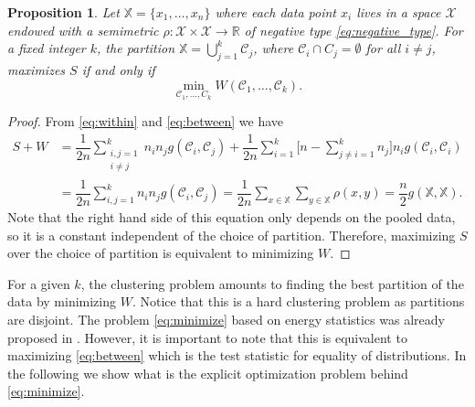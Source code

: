 \documentclass[aps,preprint,nofootinbib,floatfix]{revtex4-1}
\newtheorem{proposition}[theorem]{Proposition}
\newcommand\C{{\mathcal{C}}}
\begin{document}
\begin{proposition}
\label{th:minimize}
Let $\mathbb{X} = \{x_1,\dotsc,x_n\}$ where each data point
$x_i$ lives in a space $\mathcal{X}$ endowed with a semimetric $\rho:
\mathcal{X}\times\mathcal{X} \to \mathbb{R}$ of
negative type \eqref{eq:negative_type}. For a fixed integer $k$,
the partition
$\mathbb{X} = \bigcup_{j=1}^k \C_j$, where $\C_i \cap C_j = \emptyset$ for
all $i\ne j$, maximizes $S$ if and only if
\begin{equation}
\label{eq:minimize}
\min_{\C_1,\dotsc,C_k  } W(
\C_1, \dotsc, \C_k).
\end{equation}
\end{proposition}
\begin{proof}
From \eqref{eq:within} and \eqref{eq:between}
we have
\begin{equation}
\begin{split}
S + W &= 
\dfrac{1}{2n} \sum_{\substack{i,j=1 \\ i\ne j}}^k n_i n_j g(\C_i, \C_j)
+ \dfrac{1}{2n} \sum_{i=1}^{k} 
\bigg[ n - 
\sum_{j\ne i = 1}^k n_j \bigg] 
n_i g(\C_i, \C_i) 
\\
& = \dfrac{1}{2n} \sum_{i,j=1}^k n_i n_j g(\C_i, \C_j)
= \dfrac{1}{2n} \sum_{x \in \mathbb{X}} \sum_{y \in \mathbb{X}} \rho(x,y)
= \dfrac{n}{2} g(\mathbb{X}, \mathbb{X}).
\end{split}
\end{equation}
Note that the right hand side of this equation 
only depends on the pooled data, so it is a constant
independent of the choice of partition. Therefore, maximizing
$S$ over the choice of partition is equivalent to minimizing $W$.
\end{proof}

For a given $k$, the clustering problem amounts to
finding the best partition of the data by minimizing $W$.
Notice that this is a hard clustering problem as partitions
are disjoint. The problem \eqref{eq:minimize} based on
energy statistics was already proposed in \cite{Kgroups}. However, it is
important to note that this is equivalent to maximizing \eqref{eq:between}
which is the test statistic for equality of distributions. In the following
we show what is the explicit optimization problem behind \eqref{eq:minimize}.
\end{document}
